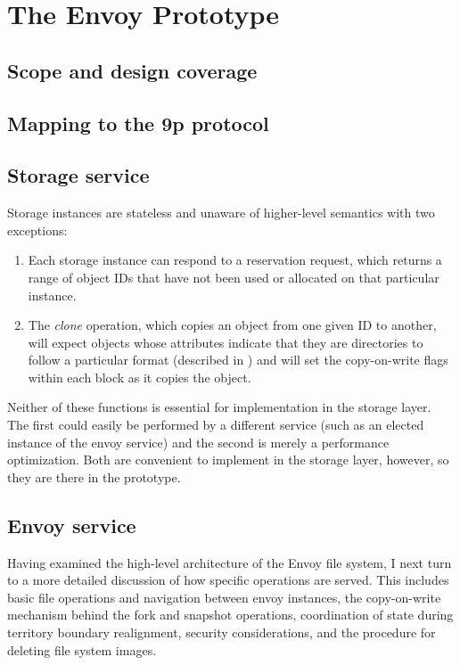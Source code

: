 \chapter{The Envoy Prototype}

\section{Scope and design coverage}

\section{Mapping to the 9p protocol}

\section{Storage service}

Storage instances are stateless and unaware of higher-level semantics with two exceptions:

\begin{enumerate}
\item Each storage instance can respond to a reservation request, which returns a range of object IDs that have not been used or allocated on that particular instance.
\item The \emph{clone} operation, which copies an object from one given ID to another, will expect objects whose attributes indicate that they are directories to follow a particular format (described in ) and will set the copy-on-write flags within each block as it copies the object.
\end{enumerate}

Neither of these functions is essential for implementation in the storage layer. The first could easily be performed by a different service (such as an elected instance of the envoy service) and the second is merely a performance optimization. Both are convenient to implement in the storage layer, however, so they are there in the prototype.

\section{Envoy service}

Having examined the high-level architecture of the Envoy file system, I next turn to a more detailed discussion of how specific operations are served. This includes basic file operations and navigation between envoy instances, the copy-on-write mechanism behind the fork and snapshot operations, coordination of state during territory boundary realignment, security considerations, and the procedure for deleting file system images.

